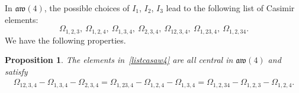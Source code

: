 \documentclass[10pt,a4paper]{amsart}
\numberwithin{equation}{section}
\newtheorem{prop}[theo]{Proposition}
\theoremstyle{definition}
\begin{document}
In $\mathfrak{aw}(4)$, the possible choices of $I_1$, $I_2$, $I_3$ lead to the following list of Casimir elements:
 \begin{equation}\label{listcasaw4}
 \varOmega_{1,2,3},\ \varOmega_{1,2,4},\ \varOmega_{1,3,4},\ \varOmega_{2,3,4},\ \varOmega_{12,3,4},\ \varOmega_{1,23,4},\ \varOmega_{1,2,34} .
 \end{equation}
We have the following properties.
\begin{prop}\label{propcas4}
 The elements in~\eqref{listcasaw4} are all central in $\mathfrak{aw}(4)$ and satisfy
\begin{eqnarray}\label{eq:cas4}
 \varOmega_{12,3,4}-\varOmega_{1,3,4}-\varOmega_{2,3,4}=\varOmega_{1,23,4}-\varOmega_{1,2,4}-\varOmega_{1,3,4}=\varOmega_{1,2,34}-\varOmega_{1,2,3}-\varOmega_{1,2,4} .
\end{eqnarray}
\end{prop}
\end{document}
